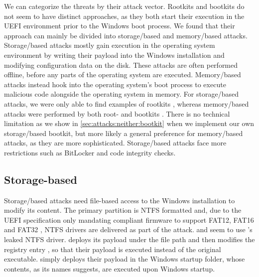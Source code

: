 We can categorize the threats by their attack vector.
Rootkits and bootkits do not seem to have distinct approaches, as they both start their execution in the \ac{UEFI} environment prior to the Windows boot process.
We found that their approach can mainly be divided into storage\-/based and memory\-/based attacks.
Storage\-/based attacks mostly gain execution in the operating system environment by writing their payload into the Windows installation and modifying configuration data on the disk.
These attacks are often performed offline, before any parts of the operating system are executed.
Memory\-/based attacks instead hook into the operating system's boot process to execute malicious code alongside the operating system in memory.
For storage\-/based attacks, we were only able to find examples of rootkits \cite{vector-edk,mosaicregressor-technical-details,lojax}, whereas memory\-/based attacks were performed by both root- and bootkits \cite{dreamboot,efiguard,especter,finspy,moonbounce,cosmicstrand}.
There is no technical limitation as we show in \autoref{sec:attacks:neither:bootkit} when we implement our own storage\-/based bootkit, but more likely a general preference for memory\-/based attacks, as they are more sophisticated.
Storage\-/based attacks face more restrictions such as BitLocker and code integrity checks.

\subsection{Storage-based}

Storage\-/based attacks need file-based access to the Windows installation to modify its content.
The primary partition is \ac{NTFS} formatted and, due to the \ac{UEFI} specification only mandating compliant firmware to support \ac{FAT}12, \ac{FAT}16 and \ac{FAT}32 \cite[Section 13.3.1.1]{uefi-spec}, \ac{NTFS} drivers are delivered as part of the attack.
\cite{mosaicregressor-technical-details} and \cite{lojax} seem to use \cite{vector-edk}'s leaked \ac{NTFS} driver.
\cite{lojax} deploys its payload under the file path  and then modifies the registry entry , so that their payload is executed instead of the original executable.
\cite{mosaicregressor-technical-details} simply deploys their payload in the Windows startup folder, whose contents, as its names suggests, are executed upon Windows startup.

